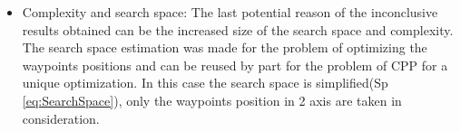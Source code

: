 \begin{itemize}
\begin{tabular}{l|p{1.3cm}p{1.3cm}p{1.3cm}p{1.3cm}p{1.3cm}p{1.3cm}}
\cellcolor[HTML]{F2F2FF}{$\sum_{i=1}^{n}Pc_i + \frac{\sum_{i=1}^{n}Pc_i}{(\frac{Distance}{N})\times 0.1}$}  &  \cellcolor[HTML]{F2F2FF}{57.78\%  426px}       & \cellcolor[HTML]{F2F2FF}{ 58.33\%  638px} & \cellcolor[HTML]{F2F2FF}{61.84\%   845px}& \cellcolor[HTML]{F2F2FF}{ 70.96\%  962px}& \cellcolor[HTML]{F2F2FF}{ 69.64\%  1099px}& \cellcolor[HTML]{F2F2FF}{ 82.50\%  1318px}\\ \hline
\end{tabular}
		\item Complexity and search space: 
		The last potential reason of the inconclusive results obtained can be the increased size of the search space and complexity. %
		The search space estimation was made for the problem of optimizing the waypoints positions and can be reused by part for the problem of CPP for a unique optimization. In this case the  search space is simplified(Sp \ref{eq:SearchSpace}), only  the waypoints position in 2 axis are taken in consideration. %

\end{itemize}
